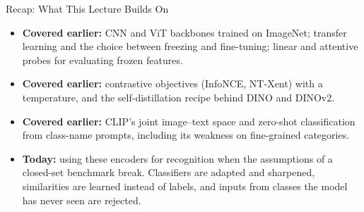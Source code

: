 \begin{frame}{Recap: What This Lecture Builds On}
  \begin{itemize}\itemsep0.35em
    \item \textbf{Covered earlier:} CNN and ViT backbones trained on ImageNet; transfer learning and the choice between freezing and fine-tuning; linear and attentive probes for evaluating frozen features.
    \item \textbf{Covered earlier:} contrastive objectives (InfoNCE, NT-Xent) with a temperature, and the self-distillation recipe behind DINO and DINOv2.
    \item \textbf{Covered earlier:} CLIP's joint image--text space and zero-shot classification from class-name prompts, including its weakness on fine-grained categories.
    \item \textbf{Today:} using these encoders for recognition when the assumptions of a closed-set benchmark break. Classifiers are adapted and sharpened, similarities are learned instead of labels, and inputs from classes the model has never seen are rejected.
  \end{itemize}
\end{frame}
